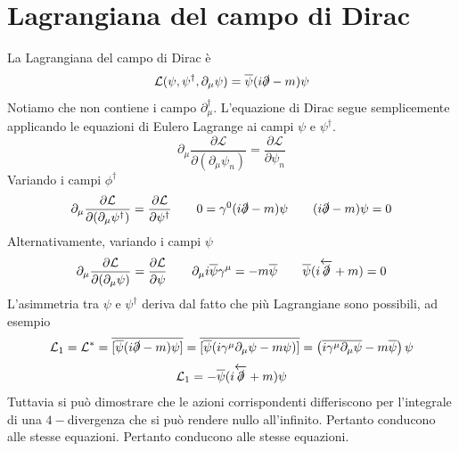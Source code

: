 \section{Lagrangiana del campo di Dirac}
La Lagrangiana del campo di Dirac è
$$
\mathcal{L}(\psi, \psi^\dagger, \partial_\mu\psi) = \overline{\psi}(i\slashed{\partial} - m)\psi
$$
Notiamo che non contiene i campo $\partial_\mu^\dagger$. L'equazione di Dirac segue semplicemente applicando le equazioni di Eulero Lagrange ai campi $\psi$ e $\psi^\dagger$. 
$$
\partial_\mu \frac{\partial\mathcal{L}}{\partial(\partial_\mu\psi_n)} = \frac{\partial\mathcal{L}}{\partial\psi_n}
$$
Variando i campi $\phi^\dagger$
$$
\partial_\mu \frac{\partial\mathcal{L}}{\partial(\partial_\mu\psi^\dagger)} = \frac{\partial\mathcal{L}}{\partial\psi^\dagger} \qquad 0 = \gamma^0(i\slashed{\partial} - m)\psi \qquad (i\slashed{\partial} - m)\psi = 0
$$
Alternativamente, variando i campi $\psi$
$$
\partial_\mu \frac{\partial\mathcal{L}}{\partial(\partial_\mu\psi)} = \frac{\partial\mathcal{L}}{\partial\psi} \qquad \partial_\mu i\overline{\psi}\gamma^\mu = -m\overline{\psi} \qquad \overline{\psi}(i\overleftarrow{\slashed{\partial}} + m) = 0
$$
L'asimmetria tra $\psi$ e $\psi^\dagger$ deriva dal fatto che più Lagrangiane sono possibili, ad esempio
$$
\mathcal{L}_1 = \mathcal{L}^* = \overline{[\overline{\psi}(i\slashed{\partial} - m)\psi]} = \overline{[\overline{\psi}(i\gamma^\mu\partial_\mu\psi - m\psi)]}=\left(\overline{i\gamma^\mu\partial_\mu\psi}-m\overline{\psi}\right)\psi
$$
$$
\mathcal{L}_1 = -\overline{\psi}(i\overleftarrow{\slashed{\partial}} + m)\psi
$$
Tuttavia si può dimostrare che le azioni corrispondenti differiscono per l'integrale di una $4-$divergenza che si può rendere nullo all'infinito. Pertanto conducono alle stesse equazioni. Pertanto conducono alle stesse equazioni.
